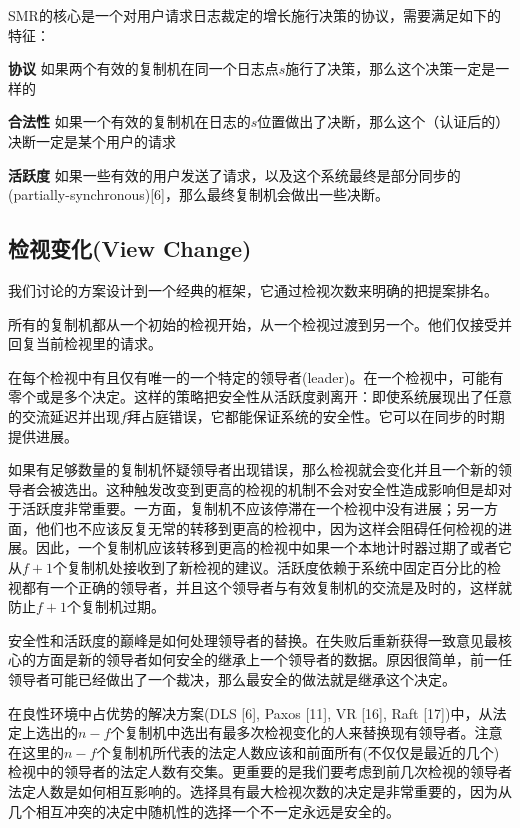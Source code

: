 \documentclass[UTF8]{ctexart}
\begin{document}
SMR的核心是一个对用户请求日志裁定的增长施行决策的协议，需要满足如下的特征：

\textbf{协议} \hspace{3mm} 如果两个有效的复制机在同一个日志点$s$施行了决策，那么这个决策一定是一样的

\textbf{合法性} \hspace{3mm} 如果一个有效的复制机在日志的$s$位置做出了决断，那么这个（认证后的）决断一定是某个用户的请求 

\textbf{活跃度} \hspace{3mm} 如果一些有效的用户发送了请求，以及这个系统最终是部分同步的(partially-synchronous)[6]，那么最终复制机会做出一些决断。

\subsection*{检视变化(View Change)}
我们讨论的方案设计到一个经典的框架，它通过检视次数来明确的把提案排名。
 
所有的复制机都从一个初始的检视开始，从一个检视过渡到另一个。他们仅接受并回复当前检视里的请求。

在每个检视中有且仅有唯一的一个特定的领导者(leader)。在一个检视中，可能有零个或是多个决定。这样的策略把安全性从活跃度剥离开：即使系统展现出了任意的交流延迟并出现$f$拜占庭错误，它都能保证系统的安全性。它可以在同步的时期提供进展。

如果有足够数量的复制机怀疑领导者出现错误，那么检视就会变化并且一个新的领导者会被选出。这种触发改变到更高的检视的机制不会对安全性造成影响但是却对于活跃度非常重要。一方面，复制机不应该停滞在一个检视中没有进展；另一方面，他们也不应该反复无常的转移到更高的检视中，因为这样会阻碍任何检视的进展。因此，一个复制机应该转移到更高的检视中如果一个本地计时器过期了或者它从$f+1$个复制机处接收到了新检视的建议。活跃度依赖于系统中固定百分比的检视都有一个正确的领导者，并且这个领导者与有效复制机的交流是及时的，这样就防止$f+1$个复制机过期。

安全性和活跃度的巅峰是如何处理领导者的替换。在失败后重新获得一致意见最核心的方面是新的领导者如何安全的继承上一个领导者的数据。原因很简单，前一任领导者可能已经做出了一个裁决，那么最安全的做法就是继承这个决定。

在良性环境中占优势的解决方案(DLS [6], Paxos [11], VR [16], Raft [17])中，从法定上选出的$n - f$个复制机中选出有最多次检视变化的人来替换现有领导者。注意在这里的$n - f$个复制机所代表的法定人数应该和前面所有(不仅仅是最近的几个)检视中的领导者的法定人数有交集。更重要的是我们要考虑到前几次检视的领导者法定人数是如何相互影响的。选择具有最大检视次数的决定是非常重要的，因为从几个相互冲突的决定中随机性的选择一个不一定永远是安全的。
\end{document}
